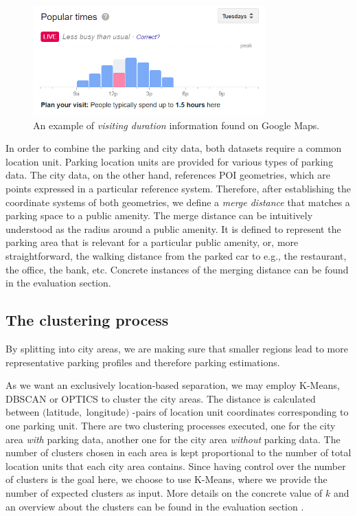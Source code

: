 \documentclass{ws-ijait}
\newcommand{\cmmnt}[1]{\ignorespaces}
\begin{document}
		\begin{figure}[!ht]
			\centering
			\includegraphics[width=0.8\textwidth]{../graphics/google_visit_duration.png}
			\caption{An example of \textit{visiting duration} information found on Google Maps.}
			\label{fig:visit_duration}
		\end{figure}  
		
		In order to combine the parking and city data, both datasets require a common location unit. Parking location units are provided for various types of parking data. The city data, on the other hand, references POI geometries, which are points expressed in a particular reference system. Therefore, after establishing the coordinate systems of both geometries, we define a \textit{merge distance} that matches a parking space to a public amenity. The merge distance can be intuitively understood as the radius around a public amenity. It is defined to represent the parking area that is relevant for a particular public amenity, or, more straightforward, the walking distance from the parked car to e.g., the restaurant, the office, the bank, etc. Concrete instances of the merging distance can be found in \cmmnt{\cref{experimental_setup:merging_parking_city_data}} the evaluation section.
		
		\subsection{The clustering process}
		By splitting into city areas, we are making sure that smaller regions lead to more representative parking profiles and therefore parking estimations. 
		
		As we want an exclusively location-based separation, we may employ K-Means, DBSCAN or OPTICS to cluster the city areas. The distance is calculated between $($latitude$,$ longitude$)$ -pairs of location unit coordinates corresponding to one parking unit. There are two clustering processes executed, one for the city area \textit{with} parking data, another one for the city area \textit{without} parking data. The number of clusters chosen in each area is kept proportional to the number of total location units that each city area contains. Since having control over the number of clusters is the goal here, we choose to use K-Means, where we provide the number of expected clusters as input. More details on the concrete value of $k$ and an overview about the clusters can be found in the evaluation section \cmmnt{\cref{experimental_setup:clustering}}.
		
\end{document}

